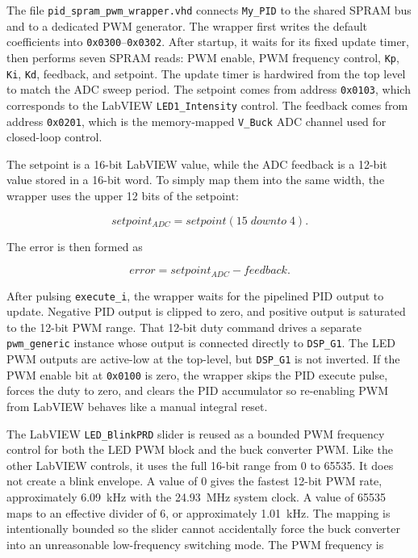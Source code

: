 \documentclass[12pt]{article}
\begin{document}
The file \texttt{pid\_spram\_pwm\_wrapper.vhd} connects \texttt{My\_PID} to the shared SPRAM bus and to a dedicated PWM generator. The wrapper first writes the default coefficients into \texttt{0x0300}--\texttt{0x0302}. After startup, it waits for its fixed update timer, then performs seven SPRAM reads: PWM enable, PWM frequency control, \texttt{Kp}, \texttt{Ki}, \texttt{Kd}, feedback, and setpoint. The update timer is hardwired from the top level to match the ADC sweep period. The setpoint comes from address \texttt{0x0103}, which corresponds to the LabVIEW \texttt{LED1\_Intensity} control. The feedback comes from address \texttt{0x0201}, which is the memory-mapped \texttt{V\_Buck} ADC channel used for closed-loop control.

The setpoint is a 16-bit LabVIEW value, while the ADC feedback is a 12-bit value stored in a 16-bit word. To simply map them into the same width, the wrapper uses the upper 12 bits of the setpoint:

\begin{equation}
  setpoint_{ADC} = setpoint(15 \; downto \; 4).
\end{equation}

\noindent The error is then formed as

\begin{equation}
  error = setpoint_{ADC} - feedback.
\end{equation}

\noindent After pulsing \texttt{execute\_i}, the wrapper waits for the pipelined PID output to update. Negative PID output is clipped to zero, and positive output is saturated to the 12-bit PWM range. That 12-bit duty command drives a separate \texttt{pwm\_generic} instance whose output is connected directly to \texttt{DSP\_G1}. The LED PWM outputs are active-low at the top-level, but \texttt{DSP\_G1} is not inverted. If the PWM enable bit at \texttt{0x0100} is zero, the wrapper skips the PID execute pulse, forces the duty to zero, and clears the PID accumulator so re-enabling PWM from LabVIEW behaves like a manual integral reset.

The LabVIEW \texttt{LED\_BlinkPRD} slider is reused as a bounded PWM frequency control for both the LED PWM block and the buck converter PWM. Like the other LabVIEW controls, it uses the full 16-bit range from 0 to 65535. It does not create a blink envelope. A value of 0 gives the fastest 12-bit PWM rate, approximately 6.09~kHz with the 24.93~MHz system clock. A value of 65535 maps to an effective divider of 6, or approximately 1.01~kHz. The mapping is intentionally bounded so the slider cannot accidentally force the buck converter into an unreasonable low-frequency switching mode. The PWM frequency is
\end{document}
